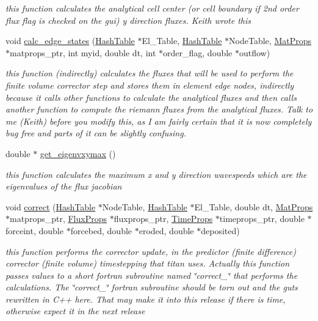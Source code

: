 \begin{CompactItemize}
\begin{CompactList}\small\item\em this function calculates the analytical cell center (or cell boundary if 2nd order flux flag is checked on the gui) y direction fluxes. Keith wrote this \item\end{CompactList}\item 
void \hyperlink{classElement_a78}{calc\_\-edge\_\-states} (\hyperlink{classHashTable}{Hash\-Table} $\ast$El\_\-Table, \hyperlink{classHashTable}{Hash\-Table} $\ast$Node\-Table, \hyperlink{structMatProps}{Mat\-Props} $\ast$matprops\_\-ptr, int myid, double dt, int $\ast$order\_\-flag, double $\ast$outflow)
\begin{CompactList}\small\item\em this function (indirectly) calculates the fluxes that will be used to perform the finite volume corrector step and stores them in element edge nodes, indirectly because it calls other functions to calculate the analytical fluxes and then calls another function to compute the riemann fluxes from the analytical fluxes. Talk to me (Keith) before you modify this, as I am fairly certain that it is now completely bug free and parts of it can be slightly confusing. \item\end{CompactList}\item 
double $\ast$ \hyperlink{classElement_a79}{get\_\-eigenvxymax} ()
\begin{CompactList}\small\item\em this function calculates the maximum x and y direction wavespeeds which are the eigenvalues of the flux jacobian \item\end{CompactList}\item 
void \hyperlink{classElement_a80}{correct} (\hyperlink{classHashTable}{Hash\-Table} $\ast$Node\-Table, \hyperlink{classHashTable}{Hash\-Table} $\ast$El\_\-Table, double dt, \hyperlink{structMatProps}{Mat\-Props} $\ast$matprops\_\-ptr, \hyperlink{structFluxProps}{Flux\-Props} $\ast$fluxprops\_\-ptr, \hyperlink{structTimeProps}{Time\-Props} $\ast$timeprops\_\-ptr, double $\ast$forceint, double $\ast$forcebed, double $\ast$eroded, double $\ast$deposited)
\begin{CompactList}\small\item\em this function performs the corrector update, in the predictor (finite difference) corrector (finite volume) timestepping that titan uses. Actually this function passes values to a short fortran subroutine named \char`\"{}correct\_\-\char`\"{} that performs the calculations. The \char`\"{}correct\_\-\char`\"{} fortran subroutine should be torn out and the guts rewritten in C++ here. That may make it into this release if there is time, otherwise expect it in the next release \item\end{CompactList}\item 

\end{CompactItemize}

